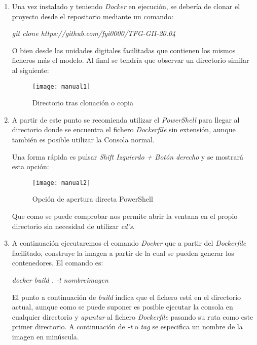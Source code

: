 \begin{enumerate}
    \item Una vez instalado y teniendo \emph{Docker} en ejecución, se debería de clonar el proyecto desde el repositorio mediante un comando:\\
    
    \begin{center}\emph{git clone https://github.com/fyi0000/TFG-GII-20.04}\end{center}
    

    O bien desde las unidades digitales facilitadas que contienen los mismos ficheros más el modelo. Al final se tendría que observar un directorio similar al siguiente:
    
    \begin{figure}[htb]
	\centering
	\texttt{[image: manual1]}
	\caption[Directorio tras clonación o copia]{Directorio tras clonación o copia}
    \end{figure}
    
    \clearpage
        
    \item A partir de este punto se recomienda utilizar el \emph{PowerShell} para llegar al directorio donde se encuentra el fichero \emph{Dockerfile} sin extensión, aunque también es posible utilizar la Consola normal.
    
    Una forma rápida es pulsar \emph{Shift Izquierdo + Botón derecho} y se mostrará esta opción:
    
    \begin{figure}[htb]
	\centering
	\texttt{[image: manual2]}
	\caption[Opción de apertura directa PowerShell]{Opción de apertura directa PowerShell}
    \end{figure}
    
    Que como se puede comprobar nos permite abrir la ventana en el propio directorio sin necesidad de utilizar \emph{cd's}.
    
    \item\label{paso5} A continuación ejecutaremos el comando \emph{Docker} que a partir del \emph{Dockerfile} facilitado, construye la imagen a partir de la cual se pueden generar los contenedores.
    El comando es: \\
    
    \begin{center}\emph{docker build . -t nombreimagen}\end{center}
    
    El punto a continuación de \emph{build} indica que el fichero está en el directorio actual, aunque como se puede suponer es posible ejecutar la consola en cualquier directorio y \emph{apuntar} al fichero \emph{Dockerfile} pasando su ruta como este primer directorio.
    A continuación de \emph{-t} o \emph{tag} se especifica un nombre de la imagen en minúscula.
    

\end{enumerate}
